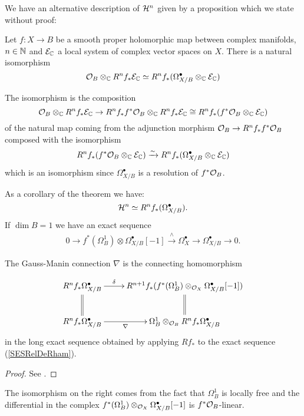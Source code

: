 \documentclass[../main.tex]{subfiles}
\begin{document}
We have an alternative description of $\mathcal{H}^n$ given by a proposition which we state without proof:
\begin{proposition} \textup{\cite[Prop 2.28]{Del70}}
    Let $f \colon X \to B$ be a smooth proper holomorphic map between complex manifolds, $n \in \mathbb{N}$ and $\mathcal{E}_{\mathbb{C}}$ a local system of complex vector spaces on $X$. There is a natural isomorphism
    \[
    \mathcal{O}_B \otimes_{\mathbb{C}} R^n f_* \mathcal{E}_{\mathbb{C}} \simeq R^n f_* ( \Omega^\bullet_{X/B } \otimes_{\mathbb{C}} \mathcal{E}_{\mathbb{C}} )
    \]
\end{proposition}
The isomorphism is the composition 
\[
\mathcal{O}_B \otimes_{\mathbb{C}} R^n f_* \mathcal{E}_{\mathbb{C}} \to  R^n f_* f^*\mathcal{O}_B \otimes_{\mathbb{C}} R^n f_* \mathcal{E}_{\mathbb{C}}   \cong R^n f_* ( f^*\mathcal{O}_B \otimes_{\mathbb{C}} \mathcal{E}_{\mathbb{C}} )
\]
of the natural map coming from the adjunction morphism $\mathcal{O}_B \to  R^n f_* f^*\mathcal{O}_B $ composed with the isomorphism 
\[
R^n f_* ( f^*\mathcal{O}_B \otimes_{\mathbb{C}} \mathcal{E}_{\mathbb{C}} ) \xrightarrow{\sim} R^n f_* ( \Omega^\bullet_{X/B } \otimes_{\mathbb{C}} \mathcal{E}_{\mathbb{C}} ) 
\]
which is an isomorphism since $\Omega^\bullet_{X/B }$ is a resolution of $ f^*\mathcal{O}_B$.

As a corollary of the theorem we have:
\[
\mathcal{H}^n \simeq R^n f_*(\Omega^\bullet_{X/B}).
\]
If $\dim B = 1$ we have an exact sequence
\begin{align}\label{SESRelDeRham}
0 \to f^*(\Omega^1_B) \otimes \Omega^\bullet_{X/B}[-1] \xrightarrow{\wedge} \Omega^\bullet_X \to \Omega^\bullet_{X/B} \to 0.
\end{align}

\begin{theorem}  \label{GaussManinThm}
     The Gauss-Manin connection $\nabla$ is the connecting homomorphism

     \begin{equation} \label{GaussManin}
\xymatrix{
   R^n f_*\Omega^\bullet_{X/B} \ar@{=}[d] \ar[r]^-{\delta} & R^{n+1} f_* (f^*(\Omega^1_B) \otimes_{\calO_X} \Omega^\bullet_{X/B}[-1]) \ar@{=}[d]    \\ 
   R^n f_*\Omega^\bullet_{X/B} \ar[r]_-{\nabla} & \Omega^1_B \otimes_{\calO_B} R^n f_* \Omega^\bullet_{X/B} 
}
\end{equation}
in the long exact sequence obtained by applying $Rf_*$ to the exact sequence (\ref{SESRelDeRham}).
\end{theorem}
\begin{proof}
    See \cite[Thm. 2]{KO68}.
\end{proof}
The isomorphism on the right comes from the fact that  $\Omega^1_B$ is locally free and the differential in the complex $f^*(\Omega^1_B) \otimes_{\mathcal{O}_X} \Omega^\bullet_{X/B}[-1]$ is $f^*\mathcal{O}_B$-linear.
\end{document}
